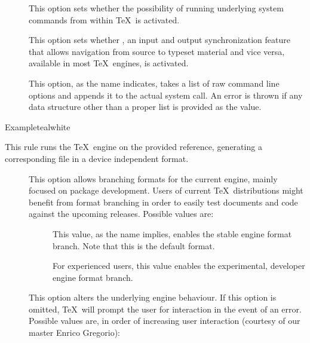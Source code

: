 \begin{description}
\begin{description}
\item[] This option sets whether the possibility of running underlying system commands from within \TeX\ is activated.

\item[] This option sets whether , an input and output synchronization feature that allows navigation from source to typeset material and vice versa, available in most \TeX\ engines, is activated.

\item[] This option, as the name indicates, takes a list of raw command line options and appends it to the actual system call. An error is thrown if any data structure other than a proper list is provided as the value.
\end{description}

\begin{codebox}{Example}{teal}{\icnote}{white}
\end{codebox}

\item[\rulebox{platex}]
This rule runs the  \TeX\ engine on the provided  reference, generating a corresponding file in a device independent format.

\begin{description}
\item[] This option allows branching formats for the current engine, mainly focused on package development. Users of current \TeX\ distributions might benefit from format branching in order to easily test documents and code against the upcoming releases. Possible values are:

\begin{description}
\item[] This value, as the name implies, enables the stable engine format branch. Note that this is the default format.

\item[] For experienced users, this value enables the experimental, developer engine format branch.
\end{description}

\item[] This option alters the underlying engine behaviour. If this option is omitted, \TeX\ will prompt the user for interaction in the event of an error. Possible values are, in order of increasing user interaction (courtesy of our master Enrico Gregorio):


\end{description}
\end{description}
